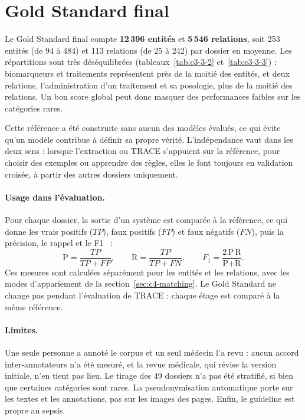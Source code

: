 \section{Gold Standard final}\label{sec:c3-3-10}

Le Gold Standard final compte \textbf{12\,396 entités} et \textbf{5\,546 relations}, soit 253 entités (de 94 à 484) et 113 relations (de 25 à 242) par dossier en moyenne. Les répartitions sont très déséquilibrées (tableaux~\ref{tab:c3-3-2} et~\ref{tab:c3-3-3}) : biomarqueurs et traitements représentent près de la moitié des entités, et deux relations, l’administration d’un traitement et sa posologie, plus de la moitié des relations. Un bon score global peut donc masquer des performances faibles sur les catégories rares.

Cette référence a été construite sans aucun des modèles évalués, ce qui évite qu’un modèle contribue à définir sa propre vérité. L’indépendance vaut dans les deux sens : lorsque l’extraction ou TRACE s’appuient sur la référence, pour choisir des exemples ou apprendre des règles, elles le font toujours en validation croisée, à partir des autres dossiers uniquement.

\paragraph{Usage dans l’évaluation.}\label{sec:c3-3-11} Pour chaque dossier, la sortie d’un système est comparée à la référence, ce qui donne les vrais positifs ($TP$), faux positifs ($FP$) et faux négatifs ($FN$), puis la précision, le rappel et le F1~\cite{hicks2022metrics,jurafsky2026slp} :
\begin{equation}
\text{P} = \frac{TP}{TP + FP}, \qquad \text{R} = \frac{TP}{TP + FN}, \qquad F_1 = \frac{2\,\text{P}\,\text{R}}{\text{P} + \text{R}}.
\end{equation}
Ces mesures sont calculées séparément pour les entités et les relations, avec les modes d’appariement de la section~\ref{sec:c4-matching}. Le Gold Standard ne change pas pendant l’évaluation de TRACE : chaque étage est comparé à la même référence.

\paragraph{Limites.}\label{sec:c3-3-12} Une seule personne a annoté le corpus et un seul médecin l’a revu : aucun accord inter-annotateurs n’a été mesuré, et la revue médicale, qui révise la version initiale, n’en tient pas lieu. Le tirage des 49 dossiers n’a pas été stratifié, si bien que certaines catégories sont rares. La pseudonymisation automatique porte sur les textes et les annotations, pas sur les images des pages. Enfin, le guideline est propre au sepsis.
